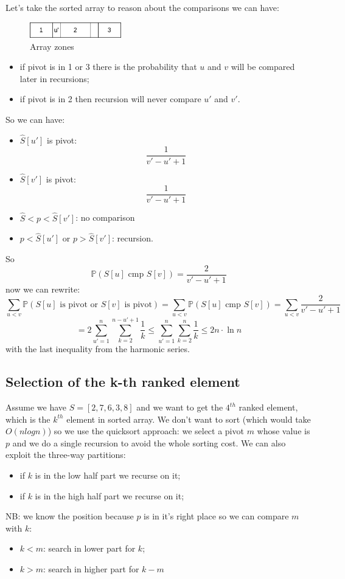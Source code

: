 Let's take the sorted array to reason about the comparisons we can have:
\begin{figure}[H]
    \centering
    \includegraphics[width=150px]{images/2_Sorting/probability.png}
    \caption{Array zones}
\end{figure}
\begin{itemize}
    \item if pivot is in 1 or 3 there is the probability that $u$ and $v$ will be compared later in recursions;
    \item if pivot is in 2 then recursion will never compare $u'$ and $v'$.
\end{itemize}
So we can have:
\begin{itemize}
    \item $\hat{S}[u']$ is pivot:
    $$
        \frac{1}{v' - u' + 1}
    $$
    
    \item $\hat{S}[v']$ is pivot:
    $$
        \frac{1}{v' - u' + 1}
    $$
    
    \item $\hat{S} < p < \hat{S}[v']$: no comparison
    
    \item $p < \hat{S}[u']$ or $p > \hat{S}[v']$: recursion.
\end{itemize}
So 
$$
    \mathbb{P} \left( S[u] \text{ cmp } S[v] \right) = \frac{2}{v' - u' + 1}
$$
now we can rewrite:
$$
    \sum_{u < v} \mathbb{P} \left( S[u] \text{ is pivot or } S[v] \text{ is pivot} \right) =  \sum_{u < v} \mathbb{P} \left( S[u] \text{ cmp } S[v] \right) = \sum_{u < v} \frac{2}{v' - u' + 1}
$$
$$
    = 2 \sum_{u'=1}^n \sum_{k=2}^{n-u'+1} \frac{1}{k} \leq \sum_{u'=1}^{n} \sum_{k=2}^{n} \frac{1}{k} \leq 2n \cdot \ln n
$$
with the last inequality from the harmonic series.

\subsection{Selection of the k-th ranked element}
Assume we have $S = [2, 7, 6, 3, 8]$ and we want to get the $4^{th}$ ranked element, which is the $k^{th}$ element in sorted array.
We don't want to sort (which would take $O(nlogn)$) so we use the quicksort approach: we select a pivot $m$ whose value is $p$ and we do a single recursion to avoid the whole sorting cost.
We can also exploit the three-way partitions:
\begin{itemize}
    \item if $k$ is in the low half part we recurse on it;
    \item if $k$ is in the high half part we recurse on it;
\end{itemize}
NB: we know the position because $p$ is in it's right place so we can compare $m$ with $k$:
\begin{itemize}
    \item $k < m$: search in lower part for $k$;
    \item $k > m$: search in higher part for $k-m$
\end{itemize}

